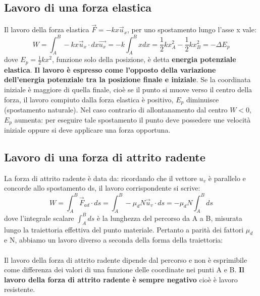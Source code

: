 \documentclass{article}
\numberwithin{equation}{subsection}
\begin{document}
\subsection{Lavoro di una forza elastica}
Il lavoro della forza elastica $\vec{F}=-kx\vec{u}_x$, per uno spostamento lungo l'asse x vale:
\begin{equation}
    W=\int_A^B -kx\vec{u}_x \cdot dx\vec{u_x}=-k \int_A^Bxdx= \frac{1}{2}kx_A^2-\frac{1}{2}kx_B^2=-\Delta E_p
\end{equation}
dove $E_p=\frac{1}{2}kx^2$, funzione solo della posizione, è detta \textbf{energia potenziale elastica}. \textbf{Il lavoro è espresso come l'opposto della variazione dell'energia potenziale tra la posizione finale e iniziale}. Se la coordinata iniziale è maggiore di quella finale, cioè se il punto si muove verso il centro della forza, il lavoro compiuto dalla forza elastica è positivo, $E_p$ diminuisce (spostamento naturale). Nel caso contrario di allontanamento dal centro $W<0$, $E_p$ aumenta: per eseguire tale spostamento il punto deve possedere une velocità iniziale oppure si deve applicare una forza opportuna.
\subsection{Lavoro di una forza di attrito radente}
La forza di attrito radente è data da: ricordando che il vettore $u_v$ è parallelo e concorde allo spostamento ds, il lavoro corrispondente si scrive:
\begin{equation}
    W=\int_A^B\vec{F}_{ad} \cdot ds = \int_A^B -\mu_dN\vec{u}_v \cdot ds=-\mu_dN\int_A^Bds
\end{equation}
dove l'integrale scalare $\int_A^Bds$ è la lunghezza del percorso da A a B, misurata lungo la traiettoria effettiva del punto materiale. Pertanto a parità dei fattori $\mu_d$ e N, abbiamo un lavoro diverso a seconda della forma della traiettoria:\\\\
Il lavoro della forza di attrito radente dipende dal percorso e non è esprimibile come differenza dei valori di una funzione delle coordinate nei punti A e B. \textbf{Il lavoro della forza di attrito radente è sempre negativo} cioè è lavoro resistente.
\end{document}
